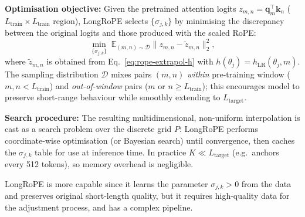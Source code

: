 \noindent\textbf{Optimisation objective:}
Given the pretrained attention logits
\(z_{m,n}=\mathbf q_m^{\top}\mathbf k_n\)
(\(L_{\text{train}}\!\times\!L_{\text{train}}\) region),
LongRoPE selects \(\{\sigma_{j,k}\}\) by minimising the discrepancy
between the original logits and those produced with the scaled RoPE:
\begin{equation}
  \min_{\{\sigma_{j,k}\}}
  \; \mathbb{E}_{(m,n)\sim\mathcal D}
  \bigl\|
    z_{m,n}
    -\tilde z_{m,n}
  \bigr\|_2^2,
  \label{eq:longrope-loss}
\end{equation}
where \(\tilde z_{m,n}\) is obtained from
Eq.~\eqref{eq:rope-extrapol-h} with
\(h(\theta_j)=h_{\text{LR}}(\theta_j,m)\).
The sampling distribution \(\mathcal D\) mixes pairs
\((m,n)\) \emph{within} pre-training window
(\(m,n<L_{\text{train}}\)) and \emph{out-of-window}
pairs (\(m\) or \(n\ge L_{\text{train}}\)); this encourages model
to preserve short-range behaviour while smoothly extending to
\(L_{\text{target}}\).

\noindent\textbf{Search procedure:}
The resulting multidimensional, non-uniform interpolation is cast as a
search problem over the discrete grid \(P\):
LongRoPE performs coordinate-wise optimisation (or Bayesian search)
until convergence, then caches the \(\sigma_{j,k}\) table for use at
inference time.  
In practice \(K\!\ll\!L_{\text{target}}\) (e.g.\ anchors every 512
tokens), so memory overhead is negligible.

LongRoPE is more capable since it learns the parameter \(\sigma_{j,k}>0\) from the data and preserves original short-length quality, but it requires high-quality data for the adjustment process, and has a complex pipeline. 


